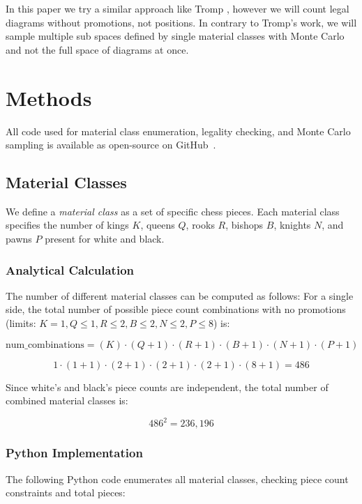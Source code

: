 \documentclass[12pt]{article}
\begin{document}
In this paper we try a similar approach like Tromp \cite{tromp2021b}, however we will count legal diagrams without promotions, not positions. In contrary to Tromp's work, we will sample multiple sub spaces defined by single material classes with Monte Carlo and not the full space of diagrams at once.


\section{Methods}
All code used for material class enumeration, legality checking, and Monte Carlo sampling 
is available as open-source on GitHub~\cite{repo}.

\subsection{Material Classes}

We define a \emph{material class} as a set of specific chess pieces. Each material class specifies the number of kings $K$, queens $Q$, rooks $R$, bishops $B$, knights $N$, and pawns $P$ present for white and black.

\subsubsection{Analytical Calculation}

The number of different material classes can be computed as follows: 
For a single side, the total number of possible piece count combinations with no promotions 
(limits: $K = 1, Q \le 1, R \le 2, B \le 2, N \le 2, P \le 8$) is:

\[
\text{num\_combinations} = (K) \cdot (Q + 1) \cdot (R + 1) \cdot (B + 1) \cdot (N + 1) \cdot (P + 1)
\]

\[
1 \cdot (1 + 1) \cdot (2 + 1) \cdot (2 + 1) \cdot (2 + 1) \cdot (8 + 1) = 486
\]

Since white's and black's piece counts are independent, the total number of
combined material classes is:

\[
486^2 = 236{,}196
\]

\subsubsection{Python Implementation}

The following Python code enumerates all material classes, checking piece
count constraints and total pieces:
\end{document}
